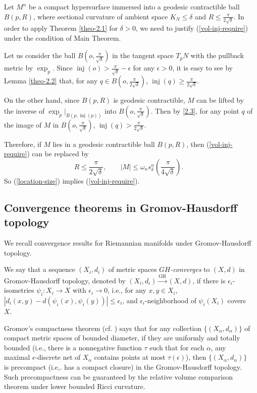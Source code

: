 \documentclass{amsart}
\numberwithin{equation}{section}
\theoremstyle{remark}
\renewcommand{\(}{\left(}
\renewcommand{\)}{\right)}
\renewcommand{\~}{\tilde}
\renewcommand{\-}{\overline}
\renewcommand{\d}{\delta}
\newcommand{\inj}{\operatorname{inj}}
\begin{document}
Let $M^n$ be a compact hypersurface immersed into a geodesic contractible ball $B(p,R)$, where sectional curvature of ambient space $K_N\le \d$ and $R\le\frac{\pi}{2\sqrt{\d}}$.
In order to apply Theorem \ref{theo-2.1} for $\d>0$, we need to justify (\ref{vol-inj-require}) under the condition of Main Theorem.

Let us consider the ball $B(o,\frac{\pi}{\sqrt{\d}})$ in the tangent space $T_pN$ with the pullback metric by $\exp_p$. Since $\inj(o)>\frac{\pi}{\sqrt{\d}}-\epsilon$ for any $\epsilon>0$, it is easy to see by Lemma \ref{theo-2.2} that, for any $q\in B(o,\frac{\pi}{2\sqrt{\d}})$, $\inj(q)\ge \frac{\pi}{2\sqrt{\d}}$.
	
On the other hand, since $B(p,R)$ is geodesic contractible, $M$ can be lifted by the inverse of $\exp_p|_{B(p,\inj(p))}$ into $B(o,\frac{\pi}{\sqrt{\d}})$. Then by \eqref{2.3}, for any point $q$ of the image of $M$ in $B(o,\frac{\pi}{\sqrt{\d}})$, $\inj(q)> \frac{\pi}{2\sqrt{\d}}$.

Therefore, if $M$ lies in a geodesic contractible ball $B(p,R)$, then (\ref{vol-inj-require}) can be replaced by
\begin{equation}
R\le\frac{\pi}{2\sqrt{\d}}, \qquad |M|\le \omega_n s_\d^n(\frac{\pi}{4\sqrt{\d}}).
\end{equation}
So (\ref{location-size}) implies (\ref{vol-inj-require}).


\subsection{Convergence theorems in Gromov-Hausdorff topology}\label{sec:2.3}
We recall convergence results for Riemannian manifolds under Gromov-Hausdorff topology.

We say that a sequence $(X_i,d_i)$ of metric spaces {\em $GH$-converges} to $(X,d)$ in Gromov-Hausdorff topology, denoted by $(X_i,d_i)\overset{\operatorname{GH}}{\longrightarrow}(X,d)$, if there is $\epsilon_i$-isometries $\psi_i:X_i\to X$ with $\epsilon_i\to 0$, i.e., for any $x,y\in X_i$, $|d_i(x,y)-d(\psi_i(x),\psi_i(y))|\le\epsilon_i$, and $\epsilon_i$-neighborhood of $\psi_i(X_i)$ covers $X$.


Gromov's compactness theorem (cf. \cite{Burago-Burago-Ivanov2001}) says that for any collection $\{(X_\alpha,d_\alpha)\}$ of compact metric spaces of bounded diameter, if they are uniformly and totally bounded (i.e., there is a nonnegative function $\tau$ such that for each $\alpha$, any maximal $\epsilon$-discrete net of $X_\alpha$ contains points at most $\tau(\epsilon)$), then $\{(X_\alpha,d_\alpha)\}$ is precompact (i.e,. has a compact closure) in the Gromov-Hausdorff topology. Such precompactness can be guaranteed by the relative volume comparison theorem under lower bounded Ricci curvature.
\end{document}
